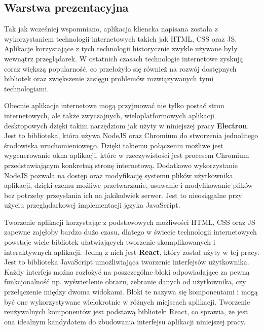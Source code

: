 \subsection{Warstwa prezentacyjna}

Tak jak wcześniej wspomniano, aplikacja kliencka napisana została z wykorzystaniem technologii
internetowych takich jak HTML, CSS oraz JS. Aplikacje korzystające z tych technologii historycznie
zwykle używane były wewnątrz przeglądarek. W ostatnich czasach technologie internetowe zyskują
coraz większą popularnoś\'c, co przełożyło się również na rozwój dostępnych bibliotek oraz zwiększenie
zasięgu problemów rozwiązywanych tymi technologiami.

Obecnie aplikacje internetowe mogą przyjmowa\'c nie tylko posta\'c stron internetowych, ale także
zwyczajnych, wieloplatformowych aplikacji desktopowych dzięki takim narzędziom jak użyty w niniejszej
pracy \textbf{Electron}. Jest to biblioteka, która używa NodeJS oraz Chromium do stworzenia jednolitego
środowiska uruchomieniowego. Dzięki takiemu połączeniu możliwe jest wygenerowanie okna aplikacji, które
w rzeczywistości jest procesem Chromium przedstawiającym konkretną stronę internetową. Dodatkowo wykorzystanie
NodeJS pozwala na dostęp oraz modyfikację systemu plików użytkownika aplikacji, dzięki czemu możliwe przetwarzanie,
usuwanie i modyfikowanie plików bez potrzeby przeysłania ich na jakikolwiek serwer. Jest to nieosiągalne
przy użyciu przeglądarkowej implementacji języka JavaScript.\newline

Tworzenie aplikacji korzystając z podstawowych możliwości HTML, CSS oraz JS zapewne zajęłoby
bardzo dużo czasu, dlatego w świecie technologii internetowych powstaje wiele bibliotek
ułatwiających tworzenie skomplikowanych i interaktywnych aplikacji. Jedną z nich jest
\textbf{React}, który został użyty w tej pracy. Jest to biblioteka JavaScript umożliwiająca
tworzenie interfejsów użytkownika. Każdy interfejs można rozłoży\'c na poszczególne bloki
odpowiadające za pewną funkcjonalnoś\'c np. wyświetlenie obrazu, zebranie danych od użytkownika,
czy przełączenie między dwoma widokami. Bloki te nazywa się komponentami i mogą by\'c one wykorzystywane
wielokrotnie w różnych miejscach aplikacji. Tworzenie reużywalnych komponentów jest podstawą
biblioteki React, co sprawia, że jest ona idealnym kandydatem do zbudowania interfejsu aplikacji
niniejszej pracy.\newline

